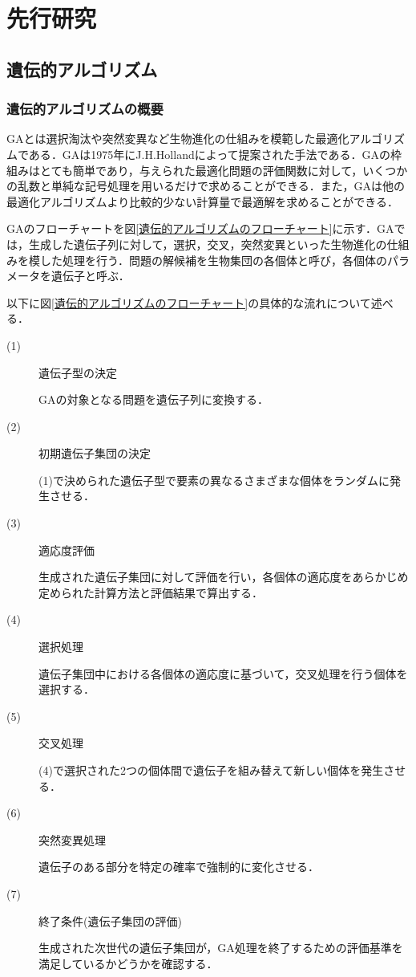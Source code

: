 \chapter{先行研究}
\thispagestyle{fancy} %
\lhead{}
\chead{}
\rhead{}
\lfoot{} 
\cfoot{\thepage}  
\rfoot{}
%

\section{遺伝的アルゴリズム}
\label{sec2.1}

\subsection{遺伝的アルゴリズムの概要}
\label{sec2.1.1}

GAとは選択淘汰や突然変異など生物進化の仕組みを模範した最適化アルゴリズムである\cite{GA}．GAは1975年にJ.H.Hollandによって提案された手法である．GAの枠組みはとても簡単であり，与えられた最適化問題の評価関数に対して，いくつかの乱数と単純な記号処理を用いるだけで求めることができる．また，GAは他の最適化アルゴリズムより比較的少ない計算量で最適解を求めることができる．

GAのフローチャートを図\ref{遺伝的アルゴリズムのフローチャート}に示す．GAでは，生成した遺伝子列に対して，選択，交叉，突然変異といった生物進化の仕組みを模した処理を行う．問題の解候補を生物集団の各個体と呼び，各個体のパラメータを遺伝子と呼ぶ．

以下に図\ref{遺伝的アルゴリズムのフローチャート}の具体的な流れについて述べる．


\begin{description}
\item[ (1) ]遺伝子型の決定

GAの対象となる問題を遺伝子列に変換する．

\item[ (2) ]初期遺伝子集団の決定

(1)で決められた遺伝子型で要素の異なるさまざまな個体をランダムに発生させる．

\item[ (3) ]適応度評価

生成された遺伝子集団に対して評価を行い，各個体の適応度をあらかじめ定められた計算方法と評価結果で算出する．

\item[ (4) ]選択処理

遺伝子集団中における各個体の適応度に基づいて，交叉処理を行う個体を選択する．

\item[ (5) ]交叉処理

(4)で選択された2つの個体間で遺伝子を組み替えて新しい個体を発生させる．

\item[ (6) ]突然変異処理

遺伝子のある部分を特定の確率で強制的に変化させる．

\item[ (7) ]終了条件(遺伝子集団の評価)

生成された次世代の遺伝子集団が，GA処理を終了するための評価基準を満足しているかどうかを確認する．
\end{description}

